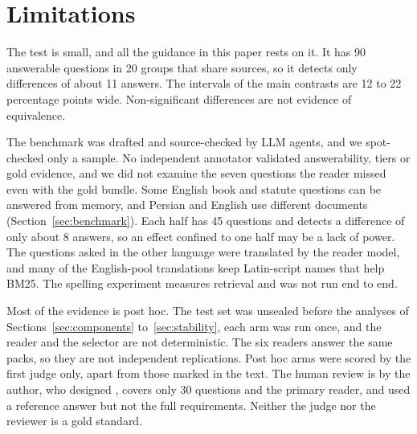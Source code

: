 \section*{Limitations}
\label{sec:limitations}

The test is small, and all the guidance in this paper rests on it. It has 90 answerable questions in 20 groups that share sources, so it detects only differences of about 11 answers. The intervals of the main contrasts are 12 to 22 percentage points wide. Non-significant differences are not evidence of equivalence.

The benchmark was drafted and source-checked by LLM agents, and we spot-checked only a sample. No independent annotator validated answerability, tiers or gold evidence, and we did not examine the seven questions the reader missed even with the gold bundle. Some English book and statute questions can be answered from memory, and Persian and English use different documents (Section~\ref{sec:benchmark}). Each half has 45 questions and detects a difference of only about 8 answers, so an effect confined to one half may be a lack of power. The questions asked in the other language were translated by the reader model, and many of the English-pool translations keep Latin-script names that help BM25. The spelling experiment measures retrieval and was not run end to end.

Most of the evidence is post hoc. The test set was unsealed before the analyses of Sections~\ref{sec:components} to~\ref{sec:stability}, each arm was run once, and the reader and the selector are not deterministic. The six readers answer the same packs, so they are not independent replications. Post hoc arms were scored by the first judge only, apart from those marked in the text. The human review is by the author, who designed \lexb, covers only 30 questions and the primary reader, and used a reference answer but not the full requirements. Neither the judge nor the reviewer is a gold standard.

